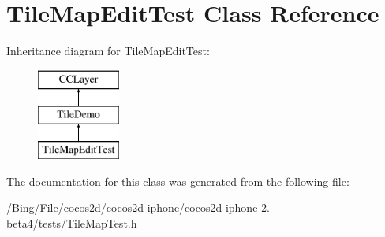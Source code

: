\hypertarget{interface_tile_map_edit_test}{\section{Tile\-Map\-Edit\-Test Class Reference}
\label{interface_tile_map_edit_test}
}
Inheritance diagram for Tile\-Map\-Edit\-Test\-:\begin{figure}[H]
\begin{center}
\leavevmode
\includegraphics[height=3.000000cm]{interface_tile_map_edit_test}
\end{center}
\end{figure}


The documentation for this class was generated from the following file\-:\begin{DoxyCompactItemize}
\item 
/\-Bing/\-File/cocos2d/cocos2d-\/iphone/cocos2d-\/iphone-\/2.-\/beta4/tests/Tile\-Map\-Test.\-h\end{DoxyCompactItemize}
